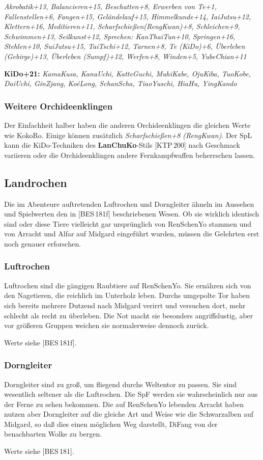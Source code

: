 \documentclass[
a4paper,
twoside,
DIV=calc,
BCOR=4mm,
fontsize=9pt,
twocolumn=on,
titlepage=on,
parskip=half
]{scrartcl}
\begin{document}
\emph{Akrobatik+13, Balancieren+15, Beschatten+8, Erwerben von Te+1,
  Fallenstellen+6, Fangen+15, Geländelauf+15, Himmelkunde+14,
  IaiJutsu+12, Klettern+16, Meditieren+11, Scharfschießen(RengKwan)+8,
  Schleichen+9, Schwimmen+13, Seilkunst+12, Sprechen: KanThaiTun+10,
  Springen+16, Stehlen+10, SuiJutsu+15, TaiTschi+12, Tarnen+8, Te
  (KiDo)+6, Überleben (Gebirge)+13, Überleben (Sumpf)+12, Werfen+8,
  Winden+5, YubeChian+11}

\textbf{KiDo+21:} \emph{KamaKusa, KanaUchi, KatteGuchi, MuhiKabe,
  OjuKiba, TuoKobe, DaiUchi, GinZjang, KoéLong, SchanScha, TiaoYuschi,
  HiaHu, YingKando}

\subsubsection{Weitere Orchideenklingen}

Der Einfachheit halber haben die anderen Orchideenklingen die gleichen
Werte wie KokoRo. Einige können zusätzlich \emph{Scharfschießen+8
  (RengKwan)}. Der SpL kann die KiDo-Techniken des
\textbf{LanChuKo}-Stils [KTP\,200] nach Geschmack variieren oder die
Orchideenklingen andere Fernkampfwaffen beherrschen lassen.

\subsection{Landrochen}

Die im Abenteure auftretenden Luftrochen und Dorngleiter ähneln im
Aussehen und Spielwerten den in [BES\,181f] beschriebenen Wesen. Ob
sie wirklich identisch sind oder diese Tiere vielleicht gar
ursprünglich von RenSchenYo stammen und von Arracht und Alfar auf
Midgard eingeführt wurden, müssen die Gelehrten erst noch genauer
erforschen.

\subsubsection{Luftrochen}

Luftrochen sind die gängigen Raubtiere auf RenSchenYo. Sie ernähren
sich von den Nagetieren, die reichlich im Unterholz leben. Durchs
umgepolte Tor haben sich bereits mehrere Dutzend nach Midgard verirrt
und versuchen dort, mehr schlecht als recht zu überleben. Die Not
macht sie besonders angriffslustig, aber vor größeren Gruppen weichen
sie normalerweise dennoch zurück.

Werte siehe [BES\,181f].

\subsubsection{Dorngleiter}

Dorngleiter sind zu groß, um fliegend durchs Weltentor zu passen. Sie
sind wesentlich seltener als die Luftrochen. Die SpF werden sie
wahrscheinlich nur aus der Ferne zu sehen bekommen. Die auf RenSchenYo
lebenden Arracht haben nutzen aber Dorngleiter auf die gleiche Art und
Weise wie die Schwarzalben auf Midgard, so daß dies einen möglichen
Weg darstellt, DiFang von der benachbarten Wolke zu bergen.

Werte siehe [BES\,181].
\end{document}
